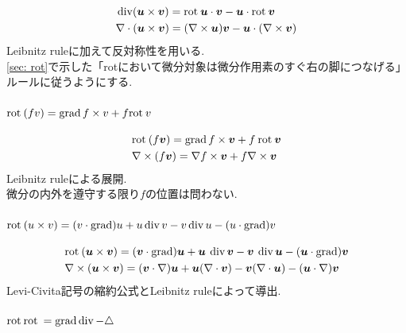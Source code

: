 \documentclass[dvipdfmx]{jsarticle}
\begin{document}
\begin{align*}
    &\operatorname{\mathrm{div}}(\bm{u}\times\bm{v})=\mathrm{rot}\:\bm{u}\cdot\bm{v}-\bm{u}\cdot\mathrm{rot}\:\bm{v}
    \\
    &\nabla\cdot(\bm{u}\times\bm{v})=(\nabla\times\bm{u})\bm{v}-\bm{u}\cdot(\nabla\times\bm{v})
\end{align*}
Leibnitz ruleに加えて反対称性を用いる.
\begin{equation*}
    
\end{equation*}
\ref{sec: rot}で示した「rotにおいて微分対象は微分作用素のすぐ右の脚につなげる」ルールに従うようにする.


\subsubsection{$\mathrm{rot}\:(fv)=\operatorname{\mathrm{grad}} f\times v+f\mathrm{rot}\: v$}

\begin{align*}
    &\mathrm{rot}\:(f\bm{v})=\operatorname{\mathrm{grad}} f\times\bm{v}+f\:\mathrm{rot}\:\bm{v}
    \\
    &\nabla\times(f\bm{v})=\nabla f\times\bm{v}+f\nabla\times\bm{v}
\end{align*}
Leibnitz ruleによる展開.
\begin{equation*}
    
\end{equation*}
微分の内外を遵守する限り$f$の位置は問わない.


\subsubsection{$\mathrm{rot}\:(u\times v)=(v\cdot\operatorname{\mathrm{grad}})u+u\operatorname{\mathrm{div}} v-v\operatorname{\mathrm{div}} u-(u\cdot\operatorname{\mathrm{grad}})v$}

\begin{align*}
    &\mathrm{rot}\:(\bm{u}\times\bm{v})
    =
    (\bm{v}\cdot\operatorname{\mathrm{grad}})\bm{u}
    +
    \bm{u}\:\operatorname{\mathrm{div}}\bm{v}
    -
    \bm{v}\:\operatorname{\mathrm{div}}\bm{u}
    -
    (\bm{u}\cdot\operatorname{\mathrm{grad}})\bm{v}
    \\
    &\nabla\times(\bm{u}\times\bm{v})
    =
    (\bm{v}\cdot\nabla)\bm{u}
    +
    \bm{u}(\nabla\cdot\bm{v})
    -
    \bm{v}(\nabla\cdot\bm{u})
    -
    (\bm{u}\cdot\nabla)\bm{v}
\end{align*}
Levi-Civita記号の縮約公式とLeibnitz ruleによって導出.
\begin{equation*}
    
\end{equation*}


\subsubsection{$\mathrm{rot}\:\mathrm{rot}\:=\operatorname{\mathrm{grad}}\operatorname{\mathrm{div}}-\triangle$}
\end{document}
